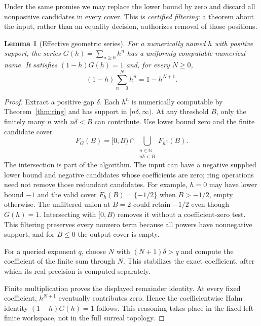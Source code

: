 \documentclass[11pt,letterpaper]{article}
\numberwithin{equation}{section}
\newtheorem{lemma}[theorem]{Lemma}
\theoremstyle{definition}
\theoremstyle{remark}
\newcommand{\N}{\mathbb N}
\begin{document}
Under the same promise we may replace the lower bound by zero and discard
all nonpositive candidates in every cover. This is \emph{certified
filtering}: a theorem about the input, rather than an equality decision,
authorizes removal of those positions.

\begin{lemma}[Effective geometric series]
\label{lem:geom}
For a numerically named $h$ with positive support, the series
$G(h)=\sum_{n\ge0}h^n$ has a uniformly computable numerical name. It satisfies
$(1-h)G(h)=1$ and, for every $N\ge0$,
\[
 (1-h)\sum_{n=0}^{N}h^n=1-h^{N+1}.
\]
\end{lemma}
\begin{proof}
Extract a positive gap $\delta$. Each $h^n$ is numerically computable by
Theorem~\ref{thm:ring} and has support in $[n\delta,\infty)$. At any
threshold $B$, only the finitely many $n$ with $n\delta<B$ can contribute.
Use lower bound zero and the finite candidate cover
\[
 F_G(B)=[0,B)\cap
 \bigcup_{\substack{n\in\N\\n\delta<B}}F_{h^n}(B).
\]
The intersection is part of the algorithm. The input can have a negative
supplied lower bound and negative candidates whose coefficients are zero;
ring operations need not remove those redundant candidates. For example,
$h=0$ may have lower bound $-1$ and the valid cover
$F_h(B)=\{-1/2\}$ when $B>-1/2$, empty otherwise. The unfiltered union at
$B=2$ could retain $-1/2$ even though $G(h)=1$. Intersecting with $[0,B)$
removes it without a coefficient-zero test. This filtering preserves every
nonzero term because all powers have nonnegative support, and for $B\le0$
the output cover is empty.

For a queried exponent $q$, choose $N$ with $(N+1)\delta>q$ and compute
the coefficient of the finite sum through $N$. This stabilizes the exact
coefficient, after which its real precision is computed separately.

Finite multiplication proves the displayed remainder identity. At every
fixed coefficient, $h^{N+1}$ eventually contributes zero. Hence the
coefficientwise Hahn identity $(1-h)G(h)=1$ follows. This reasoning takes
place in the fixed left-finite workspace, not in the full surreal topology.
\end{proof}
\end{document}
